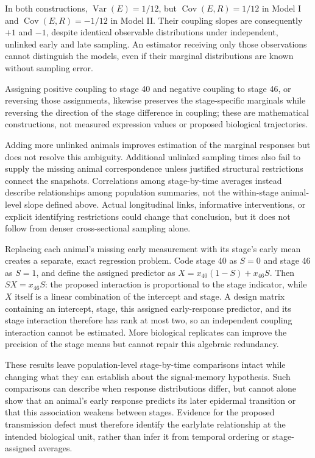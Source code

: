 \documentclass[11pt]{article}
\begin{document}
In both constructions, $\operatorname{Var}(E)=1/12$, but $\operatorname{Cov}(E,R)=1/12$ in Model I and $\operatorname{Cov}(E,R)=-1/12$ in Model II. Their coupling slopes are consequently $+1$ and $-1$, despite identical observable distributions under independent, unlinked early and late sampling. An estimator receiving only those observations cannot distinguish the models, even if their marginal distributions are known without sampling error.

Assigning positive coupling to stage 40 and negative coupling to stage 46, or reversing those assignments, likewise preserves the stage-specific marginals while reversing the direction of the stage difference in coupling; these are mathematical constructions, not measured expression values or proposed biological trajectories.

Adding more unlinked animals improves estimation of the marginal responses but does not resolve this ambiguity. Additional unlinked sampling times also fail to supply the missing animal correspondence unless justified structural restrictions connect the snapshots. Correlations among stage-by-time averages instead describe relationships among population summaries, not the within-stage animal-level slope defined above. Actual longitudinal links, informative interventions, or explicit identifying restrictions could change that conclusion, but it does not follow from denser cross-sectional sampling alone.

Replacing each animal\textquoteright{}s missing early measurement with its stage\textquoteright{}s early mean creates a separate, exact regression problem. Code stage 40 as $S=0$ and stage 46 as $S=1$, and define the assigned predictor as $X=x_{40}(1-S)+x_{46}S$. Then $SX=x_{46}S$: the proposed interaction is proportional to the stage indicator, while $X$ itself is a linear combination of the intercept and stage. A design matrix containing an intercept, stage, this assigned early-response predictor, and its stage interaction therefore has rank at most two, so an independent coupling interaction cannot be estimated. More biological replicates can improve the precision of the stage means but cannot repair this algebraic redundancy.

These results leave population-level stage-by-time comparisons intact while changing what they can establish about the signal-memory hypothesis. Such comparisons can describe when response distributions differ, but cannot alone show that an animal\textquoteright{}s early response predicts its later epidermal transition or that this association weakens between stages. Evidence for the proposed transmission defect must therefore identify the early\textendash{}\allowbreak{}late relationship at the intended biological unit, rather than infer it from temporal ordering or stage-assigned averages.
\end{document}
